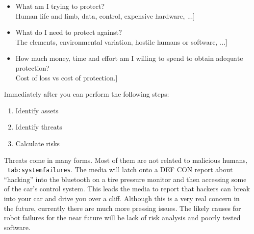 \begin{itemize}
\item
  What am I trying to protect?\\
  \hspace*{0.333em}{[}Human life and limb, data, control, expensive
  hardware, ...{]}
\item
  What do I need to protect against?\\
  \hspace*{0.333em}{[}The elements, environmental variation, hostile
  humans or software, ...{]}
\item
  How much money, time and effort am I willing to spend to obtain
  adequate protection?\\
  \hspace*{0.333em}{[}Cost of loss vs cost of protection.{]}
\end{itemize}

Immediately after you can perform the following steps:

\begin{enumerate}
\tightlist
\item
  Identify assets
\item
  Identify threats
\item
  Calculate risks
\end{enumerate}

Threats come in many forms. Most of them are not related to malicious
humans, ~\texttt{tab:systemfailures}. The media will latch onto a DEF
CON report about ``hacking'' into the bluetooth on a tire pressure
monitor and then accessing some of the car's control system. This leads
the media to report that hackers can break into your car and drive you
over a cliff. Although this is a very real concern in the future,
currently there are much more pressing issues. The likely causes for
robot failures for the near future will be lack of risk analysis and
poorly tested software.

